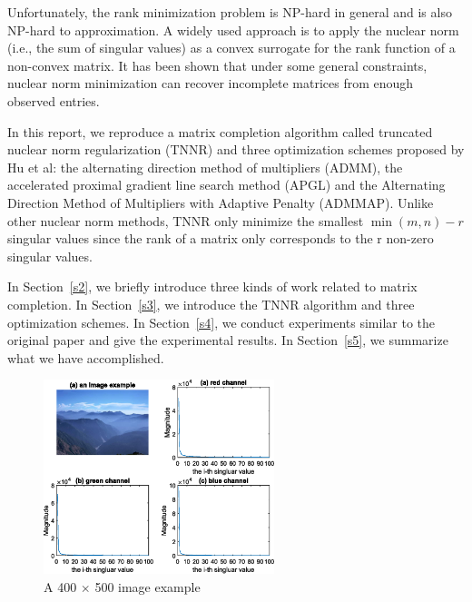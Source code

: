 \documentclass{article}
\begin{document}
{Unfortunately, the rank minimization problem is NP-hard in general and is also NP-hard to approximation.  A widely used approach is to apply the nuclear norm (i.e., the sum of singular values) as a convex surrogate for the rank function of a non-convex matrix. It has been shown that under some general constraints, nuclear norm minimization can recover incomplete matrices from enough observed entries.

In this report, we reproduce a matrix completion algorithm called truncated nuclear norm regularization (TNNR) and three optimization schemes proposed by Hu et al\cite{hu.he201309}: the alternating direction method of multipliers\cite{boyd2011distributed} (ADMM), the accelerated proximal gradient line search method\cite{beck2009fast} (APGL) and the Alternating Direction Method of Multipliers with Adaptive Penalty (ADMMAP). 
Unlike other nuclear norm methods, TNNR only minimize the smallest $\min(m, n) - r$  singular values since the rank of a matrix only corresponds to the r non-zero singular values. 

In Section~\ref{s2}, we briefly introduce three kinds of work related to matrix completion. In Section~\ref{s3}, we introduce the TNNR algorithm and three optimization schemes. In Section~\ref{s4}, we conduct experiments similar to the original paper and give the experimental results. In Section~\ref{s5}, we summarize what we have accomplished.

\begin{figure}[htbp]
    \centering
    \includegraphics[width=0.6\textwidth]{assets/fig1.eps}
    \caption{A 400 $\times$ 500 image example}
    \label{fig1}
\end{figure}

}
\end{document}
